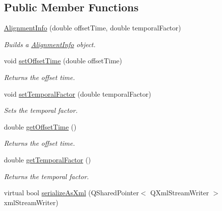 \subsection*{Public Member Functions}
\begin{DoxyCompactItemize}
\item 
\hyperlink{class_picto_1_1_alignment_info_a7112d311fec2a90a4454ce36a5338472}{Alignment\-Info} (double offset\-Time, double temporal\-Factor)
\begin{DoxyCompactList}\small\item\em Builds a \hyperlink{class_picto_1_1_alignment_info}{Alignment\-Info} object. \end{DoxyCompactList}\item 
void \hyperlink{class_picto_1_1_alignment_info_a8921fe39423771e3239e2b4209fa35a3}{set\-Offset\-Time} (double offset\-Time)
\begin{DoxyCompactList}\small\item\em Returns the offset time. \end{DoxyCompactList}\item 
void \hyperlink{class_picto_1_1_alignment_info_a32f507e5b6c746cf91579b66e1523555}{set\-Temporal\-Factor} (double temporal\-Factor)
\begin{DoxyCompactList}\small\item\em Sets the temporal factor. \end{DoxyCompactList}\item 
double \hyperlink{class_picto_1_1_alignment_info_aa61c49a8eca640df1a4c2ab59db14f2b}{get\-Offset\-Time} ()
\begin{DoxyCompactList}\small\item\em Returns the offset time. \end{DoxyCompactList}\item 
double \hyperlink{class_picto_1_1_alignment_info_af78883e4a6f087a6be6b05a5b608b9f9}{get\-Temporal\-Factor} ()
\begin{DoxyCompactList}\small\item\em Returns the temporal factor. \end{DoxyCompactList}\item 
\hypertarget{class_picto_1_1_alignment_info_a2e6dd6969717f94d8ea694a01990c33c}{virtual bool \hyperlink{class_picto_1_1_alignment_info_a2e6dd6969717f94d8ea694a01990c33c}{serialize\-As\-Xml} (Q\-Shared\-Pointer$<$ Q\-Xml\-Stream\-Writer $>$ xml\-Stream\-Writer)}\label{class_picto_1_1_alignment_info_a2e6dd6969717f94d8ea694a01990c33c}


\end{DoxyCompactItemize}

